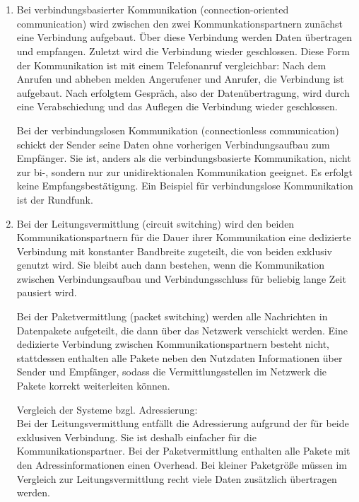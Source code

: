 \documentclass[a4paper,
			llpt,
			solution,
			accentcolor=tud2d,
			colorbacktitle
			]
			{tudexercise}
\begin{document}
\section{}
\begin{enumerate}
\item
Bei verbindungsbasierter Kommunikation (connection-oriented communication) wird zwischen den zwei Kommunkationspartnern zunächst eine Verbindung aufgebaut. Über diese Verbindung werden Daten übertragen und empfangen. Zuletzt wird die Verbindung wieder geschlossen. Diese Form der Kommunikation ist mit einem Telefonanruf vergleichbar: Nach dem Anrufen und abheben melden Angerufener und Anrufer, die Verbindung ist aufgebaut. Nach erfolgtem Gespräch, also der Datenübertragung, wird durch eine Verabschiedung und das Auflegen die Verbindung wieder geschlossen. 

Bei der verbindungslosen Kommunikation (connectionless communication) schickt der Sender seine Daten ohne vorherigen Verbindungsaufbau zum Empfänger. Sie ist, anders als die verbindungsbasierte Kommunikation, nicht zur bi-, sondern nur zur unidirektionalen Kommunikation geeignet. Es erfolgt keine Empfangsbestätigung. Ein Beispiel für verbindungslose Kommunikation ist der Rundfunk.


\item
Bei der Leitungsvermittlung (circuit switching) wird den beiden Kommunikationspartnern für die Dauer ihrer Kommunikation eine dedizierte Verbindung mit konstanter Bandbreite zugeteilt, die von beiden exklusiv genutzt wird. Sie bleibt auch dann bestehen, wenn die Kommunikation zwischen Verbindungsaufbau und Verbindungsschluss für beliebig lange Zeit pausiert wird.

Bei der Paketvermittlung (packet switching) werden alle Nachrichten in Datenpakete aufgeteilt, die dann über das Netzwerk verschickt werden. Eine dedizierte Verbindung zwischen Kommunikationspartnern besteht nicht, stattdessen enthalten alle Pakete neben den Nutzdaten Informationen über Sender und Empfänger, sodass die Vermittlungsstellen im Netzwerk die Pakete korrekt weiterleiten können. 

Vergleich der Systeme bzgl. Adressierung:\\Bei der Leitungsvermittlung entfällt die Adressierung aufgrund der für beide exklusiven Verbindung. Sie ist deshalb einfacher für die Kommunikationspartner. Bei der Paketvermittlung enthalten alle Pakete mit den Adressinformationen einen Overhead. Bei kleiner Paketgröße müssen im Vergleich zur Leitungsvermittlung recht viele Daten zusätzlich übertragen werden.


\end{enumerate}
\end{document}

